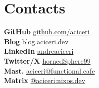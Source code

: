 \documentclass[]{cv}
\begin{document}
\begin{minipage}[t]{0.24\textwidth}
\sectionsep


\section{Contacts}
{\bf GitHub} \textrm{\href{https://github.com/}{github.com/aciceri}} \\
{\bf Blog} \href{https://blog.aciceri.dev}{blog.aciceri.dev} \\
{\bf LinkedIn} \href{https://www.linkedin.com/}{andreaciceri} \\
{\bf Twitter/X} \href{https://x.com/hornedSphere99}{hornedSphere99} \\
{\bf Mast.} \href{https://functional.cafe/@aciceri}{aciceri@functional.cafe} \\
{\bf Matrix} \href{https://matrix.to/#/@aciceri:nixos.dev}{@aciceri:nixos.dev}
\sectionsep

\end{minipage}
\end{document}
